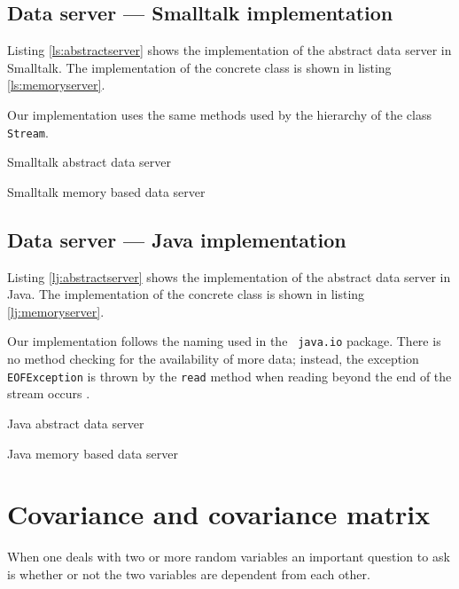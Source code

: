 \documentclass[twoside]{book}
\begin{document}

\subsection{Data server --- Smalltalk implementation}
\label{sec:sdataserver} Listing \ref{ls:abstractserver} shows the
implementation of the abstract data server in Smalltalk. The
implementation of the concrete class is shown in listing
\ref{ls:memoryserver}.

\noindent Our implementation uses the same methods used by the
hierarchy of the class {\tt Stream}.

\begin{listing} Smalltalk abstract data server \label{ls:abstractserver}

\end{listing}
\begin{listing} Smalltalk memory based data server \label{ls:memoryserver}

\end{listing}

\subsection{Data server --- Java implementation}
\label{sec:jdataserver} Listing \ref{lj:abstractserver} shows the
implementation of the abstract data server in Java. The
implementation of the concrete class is shown in listing
\ref{lj:memoryserver}.

\noindent Our implementation follows the naming used in the {\tt
java.io} package. There is no method checking for the availability
of more data; instead, the exception {\tt EOFException} is thrown
by the {\tt read} method when reading beyond the end of the stream
occurs .

\begin{listing} Java abstract data server \label{lj:abstractserver}

\end{listing}
\begin{listing} Java memory based data server \label{lj:memoryserver}

\end{listing}

\section{Covariance and covariance matrix}
\label{sec:covmatrix} When one deals with two or more random
variables an important question to ask is whether or not the two
variables are dependent from each other.
\end{document}
